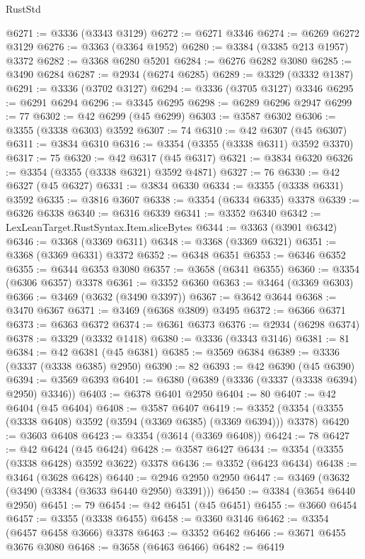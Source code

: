 \begin{lexlean}{RustStd}
\begin{coremodule}
@6271 := @3336 (@3343 @3129)
@6272 := @6271 @3346
@6274 := @6269 @6272 @3129
@6276 := @3363 (@3364 @1952)
@6280 := @3384 (@3385 @213 @1957) @3372
@6282 := @3368 @6280 @5201
@6284 := @6276 @6282 @3080
@6285 := @3490 @6284
@6287 := @2934 (@6274 @6285)
@6289 := @3329 (@3332 @1387)
@6291 := @3336 (@3702 @3127)
@6294 := @3336 (@3705 @3127) @3346
@6295 := @6291 @6294
@6296 := @3345 @6295
@6298 := @6289 @6296 @2947
@6299 := 77
@6302 := @42 @6299 (@45 @6299)
@6303 := @3587 @6302
@6306 := @3355 (@3338 @6303) @3592
@6307 := 74
@6310 := @42 @6307 (@45 @6307)
@6311 := @3834 @6310
@6316 := @3354 (@3355 (@3338 @6311) @3592 @3370)
@6317 := 75
@6320 := @42 @6317 (@45 @6317)
@6321 := @3834 @6320
@6326 := @3354 (@3355 (@3338 @6321) @3592 @4871)
@6327 := 76
@6330 := @42 @6327 (@45 @6327)
@6331 := @3834 @6330
@6334 := @3355 (@3338 @6331) @3592
@6335 := @3816 @3607
@6338 := @3354 (@6334 @6335) @3378
@6339 := @6326 @6338
@6340 := @6316 @6339
@6341 := @3352 @6340
@6342 := LexLeanTarget.RustSyntax.Item.sliceBytes
@6344 := @3363 (@3901 @6342)
@6346 := @3368 (@3369 @6311)
@6348 := @3368 (@3369 @6321)
@6351 := @3368 (@3369 @6331) @3372
@6352 := @6348 @6351
@6353 := @6346 @6352
@6355 := @6344 @6353 @3080
@6357 := @3658 (@6341 @6355)
@6360 := @3354 (@6306 @6357) @3378
@6361 := @3352 @6360
@6363 := @3464 (@3369 @6303)
@6366 := @3469 (@3632 (@3490 @3397))
@6367 := @3642 @3644
@6368 := @3470 @6367
@6371 := @3469 (@6368 @3809) @3495
@6372 := @6366 @6371
@6373 := @6363 @6372
@6374 := @6361 @6373
@6376 := @2934 (@6298 @6374)
@6378 := @3329 (@3332 @1418)
@6380 := @3336 (@3343 @3146)
@6381 := 81
@6384 := @42 @6381 (@45 @6381)
@6385 := @3569 @6384
@6389 := @3336 (@3337 (@3338 @6385) @2950)
@6390 := 82
@6393 := @42 @6390 (@45 @6390)
@6394 := @3569 @6393
@6401 := @6380 (@6389 (@3336 (@3337 (@3338 @6394) @2950) @3346))
@6403 := @6378 @6401 @2950
@6404 := 80
@6407 := @42 @6404 (@45 @6404)
@6408 := @3587 @6407
@6419 := @3352 (@3354 (@3355 (@3338 @6408) @3592 (@3594 (@3369 @6385) (@3369 @6394))) @3378)
@6420 := @3603 @6408
@6423 := @3354 (@3614 (@3369 @6408))
@6424 := 78
@6427 := @42 @6424 (@45 @6424)
@6428 := @3587 @6427
@6434 := @3354 (@3355 (@3338 @6428) @3592 @3622) @3378
@6436 := @3352 (@6423 @6434)
@6438 := @3464 (@3628 @6428)
@6440 := @2946 @2950 @2950
@6447 := @3469 (@3632 (@3490 (@3384 (@3633 @6440 @2950) @3391)))
@6450 := @3384 (@3654 @6440 @2950)
@6451 := 79
@6454 := @42 @6451 (@45 @6451)
@6455 := @3660 @6454
@6457 := @3355 (@3338 @6455)
@6458 := @3360 @3146
@6462 := @3354 (@6457 @6458 @3666) @3378
@6463 := @3352 @6462
@6466 := @3671 @6455 @3676 @3080
@6468 := @3658 (@6463 @6466)
@6482 := @6419

\end{coremodule}
\end{lexlean}
